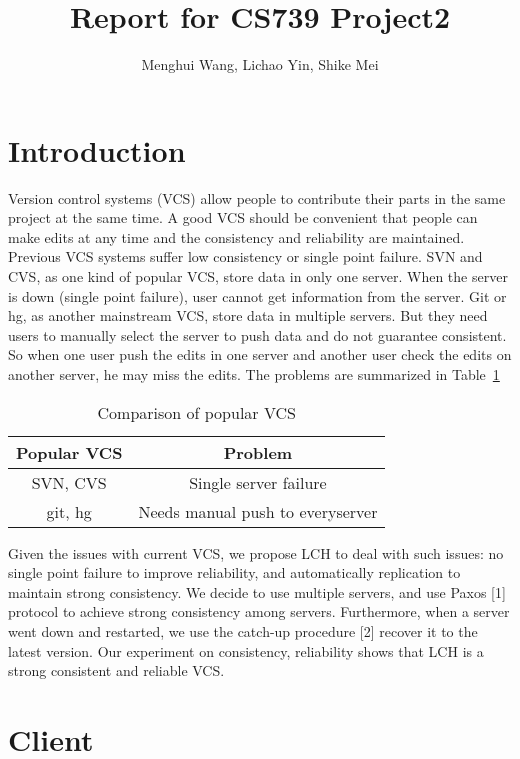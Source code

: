 \documentclass[11pt]{article}
\title{Report for CS739 Project2}
\author{Menghui Wang, Lichao Yin, Shike Mei}
\begin{document}
\maketitle
\section{Introduction}

Version control systems (VCS) allow people to contribute their parts in the same project at the same time. A good VCS should be convenient that people can make edits at any time and the consistency and reliability are maintained. Previous VCS systems suffer low consistency or single point failure. SVN and CVS, as one kind of popular VCS, store data in only one server. When the server is down (single point failure), user cannot get information from the server. Git or hg, as another mainstream VCS, store data in multiple servers. But they need users to manually select the server to push data and do not guarantee consistent. So when one user push the edits in one server and another user check the edits on another server, he may miss the edits. The problems are summarized in Table~\ref{table:problems}

\begin{table}
    \centering
\begin{tabular}{|c|c|}
  \hline
  Popular VCS & Problem  \\ \hline
  SVN, CVS & Single server failure \\
  git, hg & Needs manual push to everyserver \\
  \hline
\end{tabular}
\caption{Comparison of popular VCS}
\label{table:problems}
\end{table}

Given the issues with current VCS, we propose LCH to deal with such issues: no single point failure to improve reliability, and automatically replication to maintain strong consistency. We decide to use multiple servers, and use Paxos [1] protocol to achieve strong consistency among servers. Furthermore, when a server went down and restarted, we use the catch-up procedure [2] recover it to the latest version. Our experiment on consistency, reliability shows that LCH is a strong consistent and reliable VCS.

\section{Client}
\end{document}
